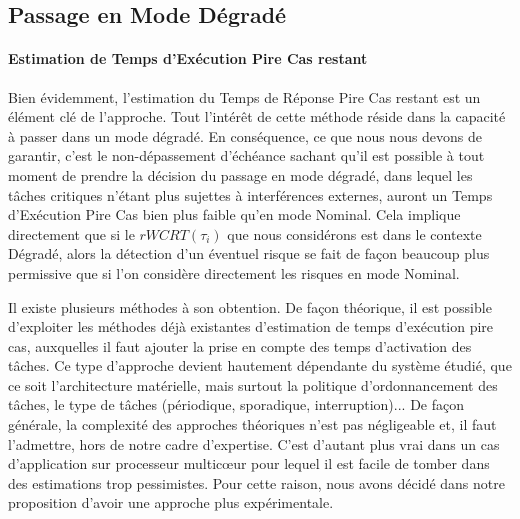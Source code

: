 \documentclass[french, a4paper, 11pt, twoside, pdftex]{StyleThese}
\begin{document}
    
    \subsection{Passage en Mode Dégradé}
    
        \paragraph{Estimation de Temps d'Exécution Pire Cas restant}
    Bien évidemment, l'estimation du Temps de Réponse Pire Cas restant est un élément clé de l'approche. Tout l'intérêt de cette méthode réside dans la capacité à passer dans un mode dégradé. En conséquence, ce que nous nous devons de garantir, c'est le non-dépassement d'échéance sachant qu'il est possible à tout moment de prendre la décision du passage en mode dégradé, dans lequel les tâches critiques n'étant plus sujettes à interférences externes, auront un Temps d'Exécution Pire Cas bien plus faible qu'en mode Nominal. 
    Cela implique directement que si le $rWCRT(\tau_i)$ que nous considérons est dans le contexte Dégradé, alors la détection d'un éventuel risque se fait de façon beaucoup plus permissive que si l'on considère directement les risques en mode Nominal.
    
    Il existe plusieurs méthodes à son obtention. 
    De façon théorique, il est possible d'exploiter les méthodes déjà existantes d'estimation de temps d'exécution pire cas, auxquelles il faut ajouter la prise en compte des temps d'activation des tâches. Ce type d'approche devient hautement dépendante du système étudié, que ce soit l'architecture matérielle, mais surtout la politique d'ordonnancement des tâches, le type de tâches (périodique, sporadique, interruption)... De façon générale, la complexité des approches théoriques n'est pas négligeable et, il faut l'admettre, hors de notre cadre d'expertise. C'est d'autant plus vrai dans un cas d'application sur processeur multicœur pour lequel il est facile de tomber dans des estimations trop pessimistes. Pour cette raison, nous avons décidé dans notre proposition d'avoir une approche plus expérimentale.
    
    
\end{document}
